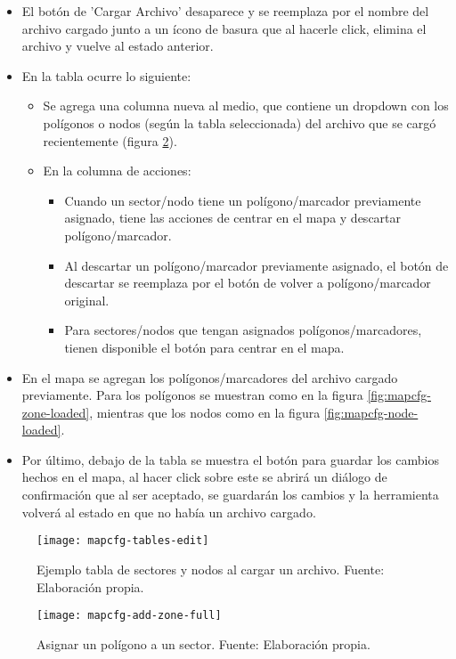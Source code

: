 \begin{itemize}
    \item El botón de 'Cargar Archivo' desaparece y se reemplaza por el nombre del archivo cargado junto a un ícono de basura que al hacerle click, elimina el archivo y vuelve al estado anterior.
    \item En la tabla ocurre lo siguiente:
    \begin{itemize}
        \item Se agrega una columna nueva al medio, que contiene un dropdown con los polígonos o nodos (según la tabla seleccionada) del archivo que se cargó recientemente (figura \ref{fig:mapcfg-add-zone-full}).
        \item En la columna de acciones:
        \begin{itemize}        
            \item Cuando un sector/nodo tiene un polígono/marcador previamente asignado, tiene las acciones de centrar en el mapa y descartar polígono/marcador.
            \item Al descartar un polígono/marcador previamente asignado, el botón de descartar se reemplaza por el botón de volver a polígono/marcador original.
            \item Para sectores/nodos que tengan asignados polígonos/marcadores, tienen disponible el botón para centrar en el mapa.
        \end{itemize}
    \end{itemize}
    \item En el mapa se agregan los polígonos/marcadores del archivo cargado previamente. Para los polígonos se muestran como en la figura \ref{fig:mapcfg-zone-loaded}, mientras que los nodos como en la figura \ref{fig:mapcfg-node-loaded}.
    \item Por último, debajo de la tabla se muestra el botón para guardar los cambios hechos en el mapa, al hacer click sobre este se abrirá un diálogo de confirmación que al ser aceptado, se guardarán los cambios y la herramienta volverá al estado en que no había un archivo cargado.
\end{itemize}

\begin{figure}[H]
	\centering
	\texttt{[image: mapcfg-tables-edit]}
	\caption{\label{fig:mapcfg-tables-edit-exameple} Ejemplo tabla de sectores y nodos al cargar un archivo. Fuente: Elaboración propia.}
\end{figure}

\begin{figure}[H]
	\centering
	\texttt{[image: mapcfg-add-zone-full]}
	\caption{\label{fig:mapcfg-add-zone-full} Asignar un polígono a un sector. Fuente: Elaboración propia.}
\end{figure}

